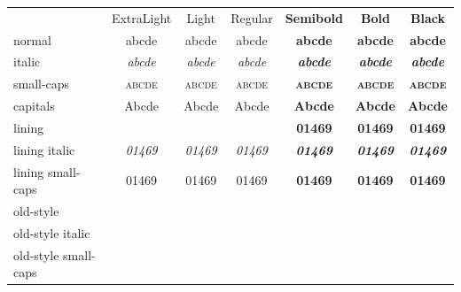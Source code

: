 \documentclass[12pt]{standalone}
\newcommand*\spA{abcde}
\newcommand*\spB{01469}
\newcommand*\spr[1][\spA]{& #1 & #1 & #1 & #1 & #1 & #1\\}
\begin{document}
\begin{tabular}{
		>{\sourceserif}l
		>{\sourceserifextreme}c
		>{\sourceseriflight}c
		>{\sourceserif}c
		>{\sourceseriflight\bfseries}c
		>{\sourceserif\bfseries}c
		>{\sourceserifextreme\bfseries}c }
	& ExtraLight & Light & Regular & Semibold & Bold & Black \\
	normal               \spr
	italic               \spr[\itshape\spA]
	small-caps           \spr[\scshape\spA]
	capitals             \spr[\MakeUppercase\spA]
	lining               \spr[\spB]
	lining italic        \spr[\itshape\spB]
	lining small-caps    \spr[\scshape\spB]
	old-style            \spr[\oldstylenums{\spB}]
	old-style italic     \spr[\oldstylenums{\itshape \spB}]
	old-style small-caps \spr[\oldstylenums{\scshape\spB}]
\end{tabular}
\end{document}
